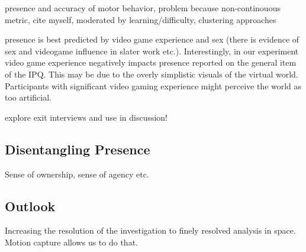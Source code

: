 presence and accuracy of motor behavior, problem because non-continouous metric, cite myself, moderated by learning/difficulty, clustering approaches

presence is best predicted by video game experience and sex (there is evidence of sex and videogame influence in slater work etc.). Interestingly, in our experiment video game experience negatively impacts presence reported on the general item of the IPQ. This may be due to the overly simplistic visuals of the virtual world. Participants with significant video gaming experience might perceive the world as too artificial.

explore exit interviews and use in discussion!

\subsection{Disentangling Presence}

Sense of ownership, sense of agency etc.

\subsection{Outlook}

Increasing the resolution of the investigation to finely resolved analysis in space. Motion capture allows us to do that.

